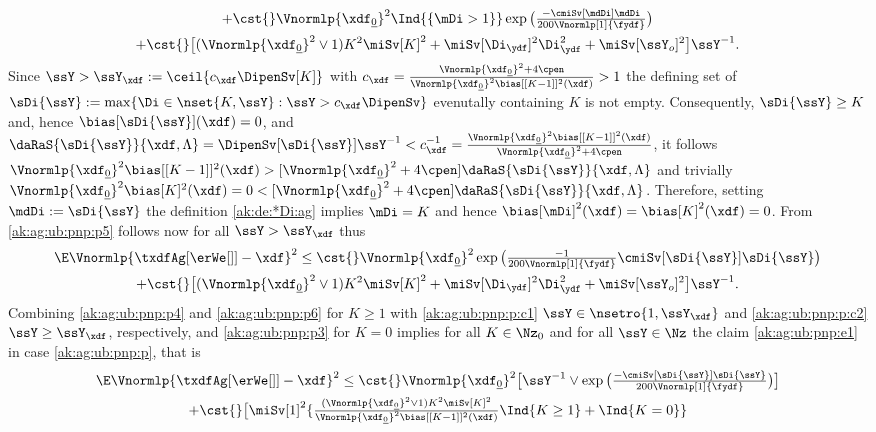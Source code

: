 \begin{pro}
\begin{multline}
    + \cst{}\Vnormlp{\xdf_{\underline{0}}}^2\Ind{\{\mDi>1\}}
    \exp\big(\tfrac{-\cmiSv[\mdDi]\mdDi}{200\Vnormlp[1]{\fydf}}\big)\\
    +\cst{}\big[(\Vnormlp{\xdf_{\underline{0}}}^2\vee1)K^2\miSv[K]^2
    +\miSv[\Di_{\ydf}]^2\Di_{\ydf}^2+\miSv[\ssY_{o}]^2 \big]\ssY^{-1}.
\end{multline}
Since
$\ssY> \ssY_{\xdf}:=\ceil{c_{\xdf}\DipenSv[K]}$ with
$c_{\xdf}=\tfrac{\Vnormlp{\xdf_{\underline{0}}}^2+4\cpen}{\Vnormlp{\xdf_{\underline{0}}}^2\bias[{[K-1]}]^2(\xdf)}>1$
the defining set of
$\sDi{\ssY}:=\max\{\Di\in\nset{K,\ssY}:\ssY>c_{\xdf}\DipenSv\}$
evenutally containing $K$ is not empty. Consequently,  $\sDi{\ssY}\geq
K$ and, hence 
$\bias[\sDi{\ssY}](\xdf)=0$, and
$\daRaS{\sDi{\ssY}}{\xdf,\Lambda}=\DipenSv[\sDi{\ssY}]\ssY^{-1}<c_{\xdf}^{-1}=\tfrac{\Vnormlp{\xdf_{\underline{0}}}^2\bias[{[K-1]}]^2(\xdf)}{\Vnormlp{\xdf_{\underline{0}}}^2+4\cpen}$,
it follows
$\Vnormlp{\xdf_{\underline{0}}}^2\bias[{[K-1]}]^2(\xdf)>[\Vnormlp{\xdf_{\underline{0}}}^2+4\cpen]\daRaS{\sDi{\ssY}}{\xdf,\Lambda}$
and trivially
$\Vnormlp{\xdf_{\underline{0}}}^2\bias[{K}]^2(\xdf)=0<[\Vnormlp{\xdf_{\underline{0}}}^2+4\cpen]\daRaS{\sDi{\ssY}}{\xdf,\Lambda}$. Therefore,
setting $\mdDi:=\sDi{\ssY}$ the definition \eqref{ak:de:*Di:ag}
implies $\mDi=K$ and hence
$\bias[\mDi]^2(\xdf)=\bias[K]^2(\xdf)=0$. From \eqref{ak:ag:ub:pnp:p5}  follows
now for all $\ssY> \ssY_{\xdf}$ thus
\begin{multline}\label{ak:ag:ub:pnp:p6}
  \E\Vnormlp{\txdfAg[{\erWe[]}]-\xdf}^2\leq  \cst{}\Vnormlp{\xdf_{\underline{0}}}^2\exp\big(\tfrac{-1}{200\Vnormlp[1]{\fydf}}\cmiSv[\sDi{\ssY}]\sDi{\ssY}\big)\\
  +\cst{}\big[(\Vnormlp{\xdf_{\underline{0}}}^2\vee1)K^2\miSv[K]^2
  +\miSv[\Di_{\ydf}]^2\Di_{\ydf}^2+\miSv[\ssY_{o}]^2 \big]\ssY^{-1}.
\end{multline}
Combining \eqref{ak:ag:ub:pnp:p4} and
    \eqref{ak:ag:ub:pnp:p6}  for $K\geq1$ with \ref{ak:ag:ub:pnp:p:c1}
$\ssY\in\nsetro{1,\ssY_{\xdf}}$ and \ref{ak:ag:ub:pnp:p:c2}
$\ssY\geq \ssY_{\xdf}$, respectively, and \eqref{ak:ag:ub:pnp:p3}  for
$K=0$ implies for all $K\in\Nz_0$ and for all $\ssY\in\Nz$ the claim
\eqref{ak:ag:ub:pnp:e1} in case \ref{ak:ag:ub:pnp:p}, that is
\begin{multline}\label{ak:ag:ub:pnp:p7}
  \E\Vnormlp{\txdfAg[{\erWe[]}]-\xdf}^2\leq
  \cst{}\Vnormlp{\xdf_{\underline{0}}}^2\big[  \ssY^{-1}\vee\exp\big(\tfrac{-\cmiSv[\sDi{\ssY}]\sDi{\ssY}}{200\Vnormlp[1]{\fydf}}\big)\big]\\
  +\cst{}\big[\miSv[1]^2\{\tfrac{(\Vnormlp{\xdf_{\underline{0}}}^2\vee1)K^2\miSv[K]^2}{\Vnormlp{\xdf_{\underline{0}}}^2\bias[{[K-1]}]^2(\xdf)}\Ind{K\geq1}+\Ind{K=0}\}

\end{multline}
\end{pro}
